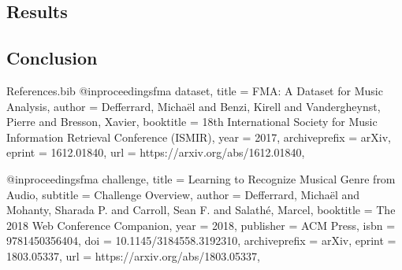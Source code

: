 \documentclass{article}
\begin{document}
\subsection{Results}
\label{sec:results}
\subsection{Conclusion}
\label{sec:conclusion}


\printbibliography[heading=bibintoc]
\begin{filecontents}{References.bib}
@inproceedings{fma dataset,
  title = {{FMA}: A Dataset for Music Analysis},
  author = {Defferrard, Micha\"el and Benzi, Kirell and Vandergheynst, Pierre and Bresson, Xavier},
  booktitle = {18th International Society for Music Information Retrieval Conference (ISMIR)},
  year = {2017},
  archiveprefix = {arXiv},
  eprint = {1612.01840},
  url = {https://arxiv.org/abs/1612.01840},
}
\end{filecontents}

@inproceedings{fma challenge,
  title = {Learning to Recognize Musical Genre from Audio},
  subtitle = {Challenge Overview},
  author = {Defferrard, Micha\"el and Mohanty, Sharada P. and Carroll, Sean F. and Salath\'e, Marcel},
  booktitle = {The 2018 Web Conference Companion},
  year = {2018},
  publisher = {ACM Press},
  isbn = {9781450356404},
  doi = {10.1145/3184558.3192310},
  archiveprefix = {arXiv},
  eprint = {1803.05337},
  url = {https://arxiv.org/abs/1803.05337},
}
\end{document}
